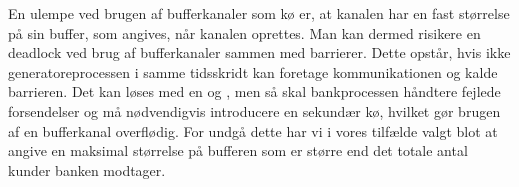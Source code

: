En ulempe ved brugen af bufferkanaler som kø er, at kanalen har en fast størrelse på sin buffer, som 
angives, når kanalen oprettes. Man kan dermed risikere en deadlock ved brug af bufferkanaler sammen med barrierer. Dette opstår, hvis ikke generatoreprocessen i samme 
tidsskridt kan foretage kommunikationen og kalde barrieren.
Det kan løses med en  og , men så 
skal bankprocessen håndtere fejlede forsendelser og må nødvendigvis introducere en 
sekundær kø, hvilket gør brugen af en bufferkanal overflødig. For undgå dette har vi i vores tilfælde valgt blot at 
angive en maksimal størrelse på bufferen som er større end det totale antal 
kunder banken modtager. 

